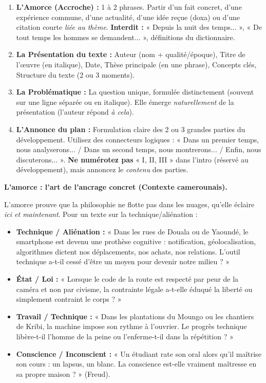 \documentclass[11pt]{article}
\begin{document}
\begin{methode}
\begin{enumerate}
    \item \textbf{L'Amorce (Accroche) :} 1 à 2 phrases. Partir d'un fait concret, d'une expérience commune, d'une actualité, d'une idée reçue (doxa) ou d'une citation courte \emph{liée au thème}. \textbf{Interdit :} « Depuis la nuit des temps... », « De tout temps les hommes se demandent... », définitions du dictionnaire.
    \item \textbf{La Présentation du texte :} Auteur (nom + qualité/époque), Titre de l'œuvre (en italique), Date, Thèse principale (en une phrase), Concepts clés, Structure du texte (2 ou 3 moments).
    \item \textbf{La Problématique :} La question unique, formulée distinctement (souvent sur une ligne séparée ou en italique). Elle émerge \emph{naturellement} de la présentation (l'auteur répond \emph{à cela}).
    \item \textbf{L'Annonce du plan :} Formulation claire des 2 ou 3 grandes parties du développement. Utilisez des connecteurs logiques : « Dans un premier temps, nous analyserons... / Dans un second temps, nous montrerons... / Enfin, nous discuterons... ». \textbf{Ne numérotez pas} « I, II, III » dans l'intro (réservé au développement), mais annoncez le \emph{contenu} des parties.
\end{enumerate}
\end{methode}

\textbf{L'amorce : l'art de l'ancrage concret (Contexte camerounais).}\par
L'amorce prouve que la philosophie ne flotte pas dans les nuages, qu'elle éclaire \emph{ici et maintenant}. Pour un texte sur la technique/aliénation :
\begin{exemplebox}
\begin{itemize}
    \item \textbf{Technique / Aliénation :} « Dans les rues de Douala ou de Yaoundé, le smartphone est devenu une prothèse cognitive : notification, géolocalisation, algorithmes dictent nos déplacements, nos achats, nos relations. L'outil technique a-t-il cessé d'être un moyen pour devenir notre milieu ? »
    \item \textbf{État / Loi :} « Lorsque le code de la route est respecté par peur de la caméra et non par civisme, la contrainte légale a-t-elle éduqué la liberté ou simplement contraint le corps ? »
    \item \textbf{Travail / Technique :} « Dans les plantations du Moungo ou les chantiers de Kribi, la machine impose son rythme à l'ouvrier. Le progrès technique libère-t-il l'homme de la peine ou l'enferme-t-il dans la répétition ? »
    \item \textbf{Conscience / Inconscient :} « Un étudiant rate son oral alors qu'il maîtrise son cours : un lapsus, un blanc. La conscience est-elle vraiment maîtresse en sa propre maison ? » (Freud).
\end{itemize}
\end{exemplebox}
\end{document}
